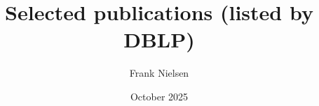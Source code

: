 \documentclass{article}
\title{Selected publications (listed by DBLP)}
\author{Frank Nielsen}
\date{October 2025}
\begin{document}
\maketitle
\nocite{*}

%


\end{document}
